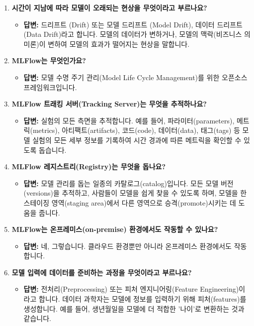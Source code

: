 \documentclass[11pt,a4paper]{article}
\theoremstyle{definition}
\begin{document}
\begin{enumerate}
    \item \textbf{시간이 지남에 따라 모델이 오래되는 현상을 무엇이라고 부르나요?}
    \begin{itemize}
        \item \textbf{답변:} 드리프트 (Drift) 또는 모델 드리프트 (Model Drift), 데이터 드리프트 (Data Drift)라고 합니다. 모델의 데이터가 변하거나, 모델의 맥락(비즈니스 의미론)이 변하여 모델의 효과가 떨어지는 현상을 말합니다.
    \end{itemize}

    \item \textbf{MLFlow는 무엇인가요?}
    \begin{itemize}
        \item \textbf{답변:} 모델 수명 주기 관리(Model Life Cycle Management)를 위한 오픈소스 프레임워크입니다.
    \end{itemize}

    \item \textbf{MLFlow 트래킹 서버(Tracking Server)는 무엇을 추적하나요?}
    \begin{itemize}
        \item \textbf{답변:} 실험의 모든 측면을 추적합니다. 예를 들어, 파라미터(parameters), 메트릭(metrics), 아티팩트(artifacts), 코드(code), 데이터(data), 태그(tags) 등 모델 실험의 모든 세부 정보를 기록하여 시간 경과에 따른 메트릭을 확인할 수 있도록 돕습니다.
    \end{itemize}

    \item \textbf{MLFlow 레지스트리(Registry)는 무엇을 돕나요?}
    \begin{itemize}
        \item \textbf{답변:} 모델 관리를 돕는 일종의 카탈로그(catalog)입니다. 모든 모델 버전(versions)을 추적하고, 사람들이 모델을 쉽게 찾을 수 있도록 하며, 모델을 한 스테이징 영역(staging area)에서 다른 영역으로 승격(promote)시키는 데 도움을 줍니다.
    \end{itemize}

    \item \textbf{MLFlow는 온프레미스(on-premise) 환경에서도 작동할 수 있나요?}
    \begin{itemize}
        \item \textbf{답변:} 네, 그렇습니다. 클라우드 환경뿐만 아니라 온프레미스 환경에서도 작동합니다.
    \end{itemize}

    \item \textbf{모델 입력에 데이터를 준비하는 과정을 무엇이라고 부르나요?}
    \begin{itemize}
        \item \textbf{답변:} 전처리(Preprocessing) 또는 피처 엔지니어링(Feature Engineering)이라고 합니다. 데이터 과학자는 모델에 정보를 입력하기 위해 피처(features)를 생성합니다. 예를 들어, 생년월일을 모델에 더 적합한 '나이'로 변환하는 것과 같습니다.
    \end{itemize}


\end{enumerate}
\end{document}
